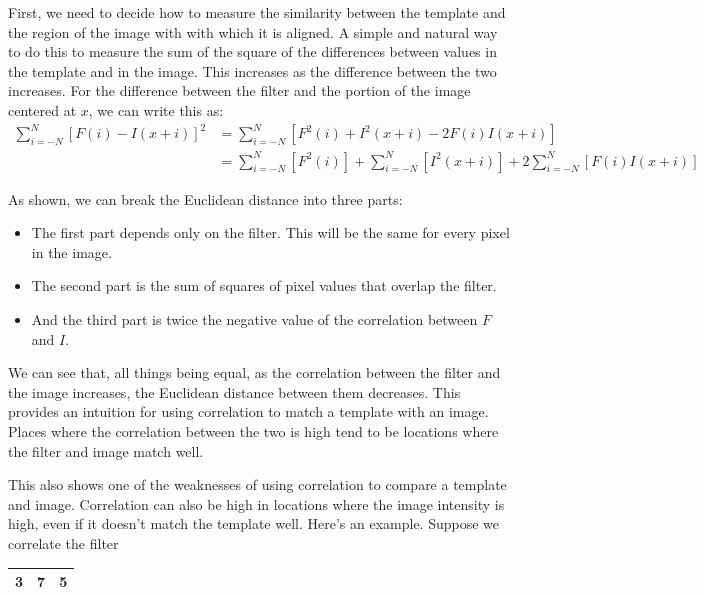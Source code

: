 \documentclass{report}
\begin{document}
First, we need to decide how to measure the similarity between the template and the region of the image with with which it is aligned. A simple and natural way to do this to measure the sum of the square of the differences between values in the template and in the image. This increases as the difference between the two increases. For the difference between the filter and the portion of the image centered at $x$, we can write this as:\newline\newline
$\begin{aligned}
    \sum_{i=-N}^{N}[F(i)-I(x+i)]^2 &= \sum_{i=-N}^{N}[F^2(i)+I^2(x+i)-2F(i)I(x+i)] \\
    &= \sum_{i=-N}^{N}[F^2(i)] + \sum_{i=-N}^{N}[I^2(x+i)] + 2\sum_{i=-N}^{N}[F(i)I(x+i)]
\end{aligned}$


As shown, we can break the Euclidean distance into three parts:
\begin{itemize}
    \item The first part depends only on the filter. This will be the same for every pixel in the image.
    \item The second part is the sum of squares of pixel values that overlap the filter.
    \item And the third part is twice the negative value of the correlation between $F$ and $I$.
\end{itemize}

We can see that, all things being equal, as the correlation between the filter and the image increases, the Euclidean distance between them decreases. This provides an intuition for using correlation to match a template with an image. Places where the correlation between the two is high tend to be locations where the filter and image match well.\newline\newline

This also shows one of the weaknesses of using correlation to compare a template and image. Correlation can also be high in locations where the image intensity is high, even if it doesn't match the template well. Here's an example. Suppose we correlate the filter \newline\newline

\begin{table}[h]
\centering
\label{my-label-5}
\begin{tabular}{|l|l|l|}
\hline
3 & 7 & 5 \\ \hline
\end{tabular}
\end{table}
\end{document}
